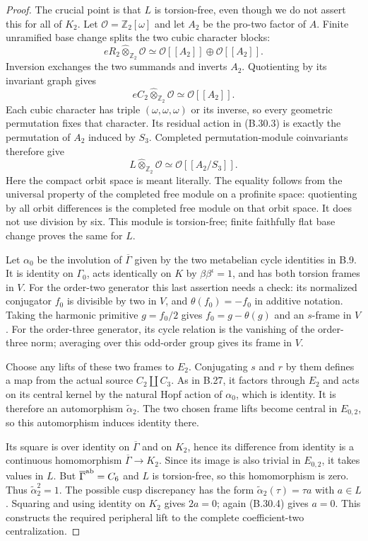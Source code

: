\begin{proof}
The crucial point is that $L$ is torsion-free, even
though we do not assert this for all of $K_2$.
Let $\mathcal O=\mathbb Z_2[\omega]$ and let
$A_2$ be the pro-two factor of $A$. Finite unramified
base change splits the two cubic character blocks:
\[
 eR_2\widehat\otimes_{\mathbb Z_2}\mathcal O
       \simeq\mathcal O[[A_2]]\oplus\mathcal O[[A_2]].
\]
Inversion exchanges the two summands and inverts
$A_2$. Quotienting by its invariant graph gives
\[
 eC_2\widehat\otimes_{\mathbb Z_2}\mathcal O
       \simeq\mathcal O[[A_2]].
 \tag{B.30.3}
\]
Each cubic character has triple $(\omega,\omega,\omega)$
or its inverse, so every geometric permutation fixes
that character. Its residual action in (B.30.3) is
exactly the permutation of $A_2$ induced by $S_3$.
Completed permutation-module coinvariants therefore
give
\[
 L\widehat\otimes_{\mathbb Z_2}\mathcal O
                \simeq\mathcal O[[A_2/S_3]].
 \tag{B.30.4}
\]
Here the compact orbit space is meant literally.
The equality follows from the universal property of
the completed free module on a profinite space:
quotienting by all orbit differences is the completed
free module on that orbit space. It does not use
division by six. This module is torsion-free; finite
faithfully flat base change proves the same for $L$.

Let $\alpha_0$ be the involution of $\overline\Gamma$
given by the two metabelian cycle identities in B.9.
It is identity on $\Gamma_0$, acts identically on
$K$ by $\beta\beta^\iota=1$, and has both torsion
frames in $V$. For the order-two generator this last
assertion needs a check: its normalized conjugator
$f_0$ is divisible by two in $V$, and
$\theta(f_0)=-f_0$ in additive notation. Taking the
harmonic primitive $g=f_0/2$ gives
$f_0=g-\theta(g)$ and an $s$-frame in $V$.
For the order-three generator, its cycle relation
is the vanishing of the order-three norm; averaging
over this odd-order group gives its frame in $V$.

Choose any lifts of these two frames to $E_2$.
Conjugating $s$ and $r$ by them defines a map from
the actual source $C_2\amalg C_3$. As in B.27,
it factors through $E_2$ and acts on its central
kernel by the natural Hopf action of $\alpha_0$,
which is identity. It is therefore an automorphism
$\widetilde\alpha_2$. The two chosen frame lifts
become central in $E_{0,2}$, so this automorphism
induces identity there.

Its square is over identity on $\overline\Gamma$
and on $K_2$, hence its difference from identity
is a continuous homomorphism
$\overline\Gamma\to K_2$. Since its image is also
trivial in $E_{0,2}$, it takes values in $L$.
But $\overline\Gamma^{\rm ab}=C_6$ and $L$ is
torsion-free, so this homomorphism is zero.
Thus $\widetilde\alpha_2^2=1$.
The possible cusp discrepancy has the form
$\widetilde\alpha_2(\tau)=\tau a$ with $a\in L$.
Squaring and using identity on $K_2$ gives $2a=0$;
again (B.30.4) gives $a=0$.
This constructs the required peripheral lift to
the complete coefficient-two centralization.


\end{proof}
